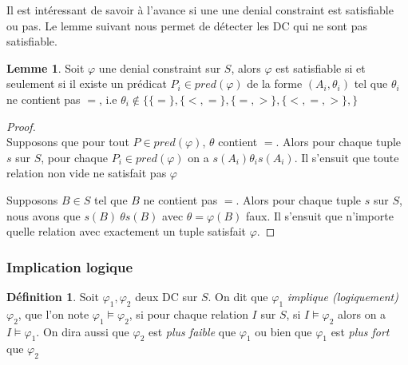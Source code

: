 \documentclass[letterpaper, 12pt]{report}
\theoremstyle{definition}
\newtheorem{mydef}{Définition}
\newtheorem{mylemma}{Lemme}
\newcommand{\alinea}{
\hspace*{0.5cm}}
\begin{document}
Il est intéressant de savoir à l'avance si une une denial constraint est satisfiable ou pas. Le lemme suivant nous permet de détecter les DC qui ne sont pas satisfiable.

\begin{mylemma}\label{satisLemma}
	Soit $\varphi$ une denial constraint sur $S$, alors $\varphi$ est satisfiable si et seulement si il existe un prédicat $P_i \in pred (\varphi)$ de la forme $(A_i,\theta_i)$ tel que $\theta_i$ ne contient pas $=$, i.e $\theta_i \not\in \{ \{=\},\{<,=\},\{=,>\},\{<,=,>\},\} $ 
\end{mylemma}
\begin{proof}~\\
\alinea \framebox{$\implies$} Supposons que pour tout $P \in pred(\varphi)$, $\theta$ contient $=$. Alors pour chaque tuple $s$ sur $S$, pour chaque $P_i \in pred(\varphi)$ on a $s(A_i) \theta_i s(A_i)$. Il s'ensuit que toute relation non vide ne satisfait pas $\varphi$

\framebox{$\impliedby$} Supposons $B \in S$ tel que $B$ ne contient pas $=$. Alors pour chaque tuple $s$ sur $S$, nous avons que $s(B)\ \theta s(B)$ avec $\theta=\varphi(B)$ faux. Il s'ensuit que n'importe quelle relation avec exactement un tuple satisfait $\varphi$.

\end{proof}


\subsubsection{Implication logique}

\begin{mydef}
Soit $\varphi_1,\varphi_2$ deux DC sur $S$. On dit que $\varphi_1$ \emph{implique (logiquement)} $\varphi_2$, que l'on note $\varphi_1 \models\varphi_2$, si pour chaque relation $I$ sur $S$, si $I \models \varphi_2$ alors on a $I \models \varphi_1$. On dira aussi que $\varphi_2$ est \emph{plus faible} que $\varphi_1$ ou bien que $\varphi_1$ est \emph{plus fort} que $\varphi_2$
\end{mydef}
\end{document}
